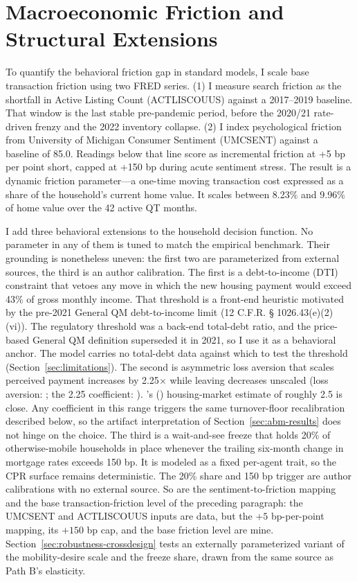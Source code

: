 \documentclass[12pt]{article}
\newcommand{\citepos}[1]{\citeauthor{#1}'s (\citeyear{#1})}
\begin{document}
\section{Macroeconomic Friction and Structural Extensions}\label{sec:method-frictions}

To quantify the behavioral friction gap in standard models, I scale base transaction friction using two FRED series. (1) I measure search friction as the shortfall in Active Listing Count (ACTLISCOUUS) against a 2017--2019 baseline. That window is the last stable pre-pandemic period, before the 2020/21 rate-driven frenzy and the 2022 inventory collapse. (2) I index psychological friction from University of Michigan Consumer Sentiment (UMCSENT) against a baseline of 85.0. Readings below that line score as incremental friction at +5 bp per point short, capped at +150 bp during acute sentiment stress. The result is a dynamic friction parameter---a one-time moving transaction cost expressed as a share of the household's current home value. It scales between 8.23\% and 9.96\% of home value over the 42 active QT months.

I add three behavioral extensions to the household decision function. No parameter in any of them is tuned to match the empirical benchmark. Their grounding is nonetheless uneven: the first two are parameterized from external sources, the third is an author calibration. The first is a debt-to-income (DTI) constraint that vetoes any move in which the new housing payment would exceed 43\% of gross monthly income. That threshold is a front-end heuristic motivated by the pre-2021 General QM debt-to-income limit (12 C.F.R. \S{} 1026.43(e)(2)(vi)). The regulatory threshold was a back-end total-debt ratio, and the price-based General QM definition superseded it in 2021, so I use it as a behavioral anchor. The model carries no total-debt data against which to test the threshold (Section~\ref{sec:limitations}). The second is asymmetric loss aversion that scales perceived payment increases by 2.25$\times$ while leaving decreases unscaled (loss aversion: \citealp{kahneman1979}; the 2.25 coefficient: \citealp{tversky1992}). \citepos{andersen2022} housing-market estimate of roughly 2.5 is close. Any coefficient in this range triggers the same turnover-floor recalibration described below, so the artifact interpretation of Section~\ref{sec:abm-results} does not hinge on the choice. The third is a wait-and-see freeze that holds 20\% of otherwise-mobile households in place whenever the trailing six-month change in mortgage rates exceeds 150 bp. It is modeled as a fixed per-agent trait, so the CPR surface remains deterministic. The 20\% share and 150 bp trigger are author calibrations with no external source. So are the sentiment-to-friction mapping and the base transaction-friction level of the preceding paragraph: the UMCSENT and ACTLISCOUUS inputs are data, but the $+5$ bp-per-point mapping, its $+150$ bp cap, and the base friction level are mine. Section~\ref{sec:robustness-crossdesign} tests an externally parameterized variant of the mobility-desire scale and the freeze share, drawn from the same source as Path B's elasticity.
\end{document}
